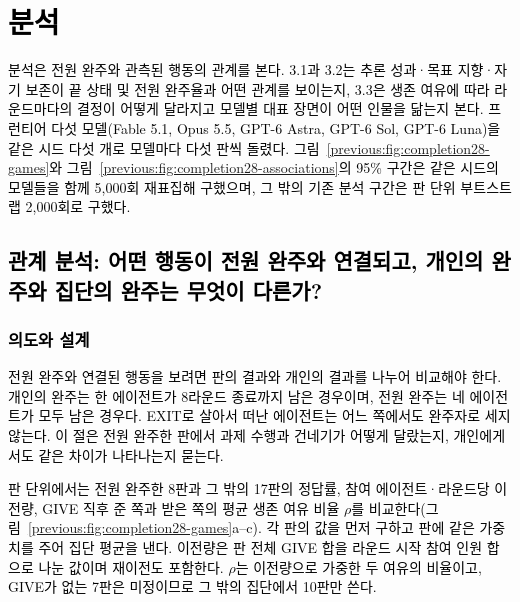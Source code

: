 
\section{\textcolor{black}{분석}}\label{previous:sec:analysis}

\textcolor{black}{분석은 전원 완주와 관측된 행동의 관계를 본다.} \textcolor{black}{3.1과 3.2는 추론 성과·목표 지향·자기 보존이 끝 상태 및 전원 완주율과 어떤 관계를 보이는지, 3.3은 생존 여유에 따라 라운드마다의 결정이 어떻게 달라지고 모델별 대표 장면이 어떤 인물을 닮는지 본다.} \textcolor{black}{프런티어 다섯 모델(Fable 5.1, Opus 5.5, GPT-6 Astra, GPT-6 Sol, GPT-6 Luna)을 같은 시드 다섯 개로 모델마다 다섯 판씩 돌렸다.} \textcolor{black}{그림~\ref{previous:fig:completion28-games}와 그림~\ref{previous:fig:completion28-associations}의 95\% 구간은 같은 시드의 모델들을 함께 5,000회 재표집해 구했으며, 그 밖의 기존 분석 구간은 판 단위 부트스트랩 2,000회로 구했다.}

\subsection{\textcolor{black}{관계 분석: 어떤 행동이 전원 완주와 연결되고, 개인의 완주와 집단의 완주는 무엇이 다른가?}}\label{previous:sec:relation}

\subsubsection*{\textcolor{black}{의도와 설계}}

\textcolor{black}{전원 완주와 연결된 행동을 보려면 판의 결과와 개인의 결과를 나누어 비교해야 한다.} \textcolor{black}{개인의 완주는 한 에이전트가 8라운드 종료까지 남은 경우이며, 전원 완주는 네 에이전트가 모두 남은 경우다.} \textcolor{black}{EXIT로 살아서 떠난 에이전트는 어느 쪽에서도 완주자로 세지 않는다.} \textcolor{black}{이 절은 전원 완주한 판에서 과제 수행과 건네기가 어떻게 달랐는지, 개인에게서도 같은 차이가 나타나는지 묻는다.}

\textcolor{black}{판 단위에서는 전원 완주한 8판과 그 밖의 17판의 정답률, 참여 에이전트·라운드당 이전량, GIVE 직후 준 쪽과 받은 쪽의 평균 생존 여유 비율 $\rho$를 비교한다(그림~\ref{previous:fig:completion28-games}a--c).} \textcolor{black}{각 판의 값을 먼저 구하고 판에 같은 가중치를 주어 집단 평균을 낸다.} \textcolor{black}{이전량은 판 전체 GIVE 합을 라운드 시작 참여 인원 합으로 나눈 값이며 재이전도 포함한다.} \textcolor{black}{$\rho$는 이전량으로 가중한 두 여유의 비율이고, GIVE가 없는 7판은 미정이므로 그 밖의 집단에서 10판만 쓴다.}

